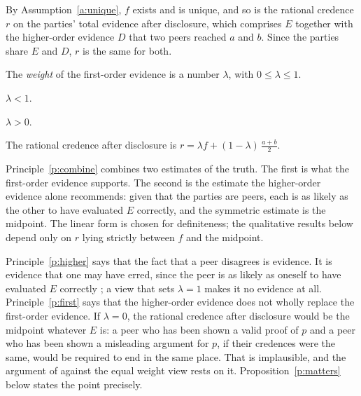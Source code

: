 \documentclass{situationist-preprint}
\begin{document}
By Assumption~\ref{a:unique}, $f$ exists and is unique, and so is the rational credence $r$ on the parties' total evidence after disclosure, which comprises $E$ together with the higher-order evidence $D$ that two peers reached $a$ and $b$. Since the parties share $E$ and $D$, $r$ is the same for both.

\begin{definition}[Weight]\label{d:weight}
The \emph{weight} of the first-order evidence is a number $\lambda$, with $0 \leq \lambda \leq 1$.
\end{definition}

\begin{principle}\label{p:higher}
$\lambda < 1$.
\end{principle}

\begin{principle}\label{p:first}
$\lambda > 0$.
\end{principle}

\begin{principle}[Combination]\label{p:combine}
The rational credence after disclosure is $r = \lambda f + (1-\lambda)\,\frac{a+b}{2}$.
\end{principle}

Principle~\ref{p:combine} combines two estimates of the truth. The first is what the first-order evidence supports. The second is the estimate the higher-order evidence alone recommends: given that the parties are peers, each is as likely as the other to have evaluated $E$ correctly, and the symmetric estimate is the midpoint. The linear form is chosen for definiteness; the qualitative results below depend only on $r$ lying strictly between $f$ and the midpoint.

Principle~\ref{p:higher} says that the fact that a peer disagrees is evidence. It is evidence that one may have erred, since the peer is as likely as oneself to have evaluated $E$ correctly \citep{Christensen2007}; a view that sets $\lambda = 1$ makes it no evidence at all. Principle~\ref{p:first} says that the higher-order evidence does not wholly replace the first-order evidence. If $\lambda = 0$, the rational credence after disclosure would be the midpoint whatever $E$ is: a peer who has been shown a valid proof of $p$ and a peer who has been shown a misleading argument for $p$, if their credences were the same, would be required to end in the same place. That is implausible, and the argument of \citet{Kelly2010} against the equal weight view rests on it. Proposition~\ref{p:matters} below states the point precisely.
\end{document}
